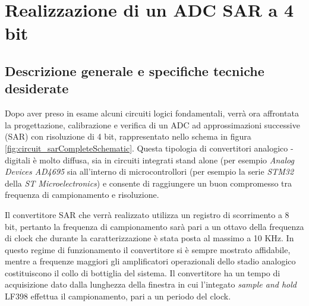 \documentclass[journal]{IEEEtran}
\begin{document}
\section{Realizzazione di un ADC SAR a 4 bit}

\subsection{Descrizione generale e specifiche tecniche desiderate}
Dopo aver preso in esame alcuni circuiti logici fondamentali, verrà ora affrontata la progettazione, calibrazione e verifica di un ADC ad approssimazioni successive (SAR) con risoluzione di 4 bit, rappresentato nello schema in figura \ref{fig:circuit_sarCompleteSchematic}. Questa tipologia di convertitori analogico - digitali è molto diffusa, sia in circuiti integrati stand alone (per esempio \textit{Analog Devices AD4695} sia all'interno di microcontrollori (per esempio la serie \textit{STM32} della \textit{ST Microelectronics}) e consente di raggiungere un buon compromesso tra frequenza di campionamento e risoluzione.

Il convertitore SAR che verrà realizzato utilizza un registro di scorrimento a 8 bit, pertanto la frequenza di campionamento sarà pari a un ottavo della frequenza di clock che durante la caratterizzazione è stata posta al massimo a 10 KHz. In questo regime di funzionamento il convertitore si è sempre mostrato affidabile, mentre a frequenze maggiori gli amplificatori operazionali dello stadio analogico costituiscono il collo di bottiglia del sistema. Il convertitore ha un tempo di acquisizione dato dalla lunghezza della finestra in cui l'integato \textit{sample and hold} LF398 effettua il campionamento, pari a un periodo del clock.
\end{document}
